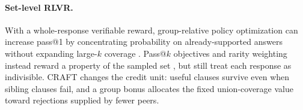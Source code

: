 \paragraph{Set-level RLVR.}
With a whole-response verifiable reward, group-relative policy optimization
can increase pass@1 by concentrating probability on already-supported
answers without expanding large-\(k\) coverage
\citep{yue2025rlcapacity,he2025unlikeliness}.  Pass@\(k\) objectives and
rarity weighting instead reward a property of the sampled set
\citep{walder2025pkpo,chen2025passktraining,he2025unlikeliness}, but still
treat each response as indivisible.  CRAFT changes the credit unit: useful
clauses survive even when sibling clauses fail, and a group bonus allocates
the fixed union-coverage value toward rejections supplied by fewer peers.


